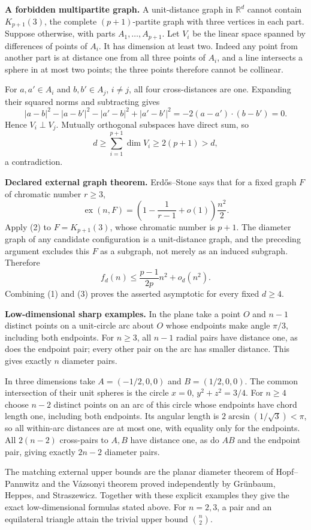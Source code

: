 \textbf{A forbidden multipartite graph.} A unit-distance graph in $\mathbb R^d$ cannot contain $K_{p+1}(3)$, the complete $(p+1)$-partite graph with three vertices in each part. Suppose otherwise, with parts $A_1,\ldots,A_{p+1}$. Let $V_i$ be the linear space spanned by differences of points of $A_i$. It has dimension at least two. Indeed any point from another part is at distance one from all three points of $A_i$, and a line intersects a sphere in at most two points; the three points therefore cannot be collinear.

For $a,a'\in A_i$ and $b,b'\in A_j$, $i\ne j$, all four cross-distances are one. Expanding their squared norms and subtracting gives
\[
|a-b|^2-|a-b'|^2-|a'-b|^2+|a'-b'|^2
=-2(a-a')\cdot(b-b')=0.
\]
Hence $V_i\perp V_j$. Mutually orthogonal subspaces have direct sum, so
\[
d\geq\sum_{i=1}^{p+1}\dim V_i\geq2(p+1)>d,
\]
a contradiction.

\textbf{Declared external graph theorem.} Erd\H{o}s--Stone says that for a fixed graph $F$ of chromatic number $r\geq3$,
\[
\operatorname{ex}(n,F)
=\left(1-\frac1{r-1}+o(1)\right)\frac{n^2}{2}.
\tag{2}
\]
Apply (2) to $F=K_{p+1}(3)$, whose chromatic number is $p+1$. The diameter graph of any candidate configuration is a unit-distance graph, and the preceding argument excludes this $F$ as a subgraph, not merely as an induced subgraph. Therefore
\[
f_d(n)\leq\frac{p-1}{2p}n^2+o_d(n^2).
\tag{3}
\]
Combining (1) and (3) proves the asserted asymptotic for every fixed $d\geq4$.

\textbf{Low-dimensional sharp examples.} In the plane take a point $O$ and $n-1$ distinct points on a unit-circle arc about $O$ whose endpoints make angle $\pi/3$, including both endpoints. For $n\geq3$, all $n-1$ radial pairs have distance one, as does the endpoint pair; every other pair on the arc has smaller distance. This gives exactly $n$ diameter pairs.

In three dimensions take $A=(-1/2,0,0)$ and $B=(1/2,0,0)$. The common intersection of their unit spheres is the circle $x=0$, $y^2+z^2=3/4$. For $n\geq4$ choose $n-2$ distinct points on an arc of this circle whose endpoints have chord length one, including both endpoints. Its angular length is $2\arcsin(1/\sqrt3)<\pi$, so all within-arc distances are at most one, with equality only for the endpoints. All $2(n-2)$ cross-pairs to $A,B$ have distance one, as do $AB$ and the endpoint pair, giving exactly $2n-2$ diameter pairs.

The matching external upper bounds are the planar diameter theorem of Hopf--Pannwitz and the V\'azsonyi theorem proved independently by Gr\"unbaum, Heppes, and Straszewicz. Together with these explicit examples they give the exact low-dimensional formulas stated above. For $n=2,3$, a pair and an equilateral triangle attain the trivial upper bound $\binom n2$.

